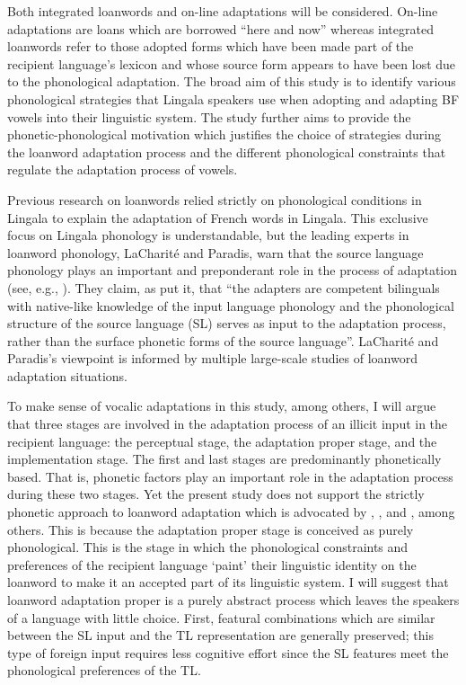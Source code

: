 \documentclass[output=paper]{langscibook}
\begin{document}
\begin{sloppypar}
Both integrated loanwords and on-line adaptations \citep{shinohara1997analyse} will be considered. On-line adaptations are loans which are borrowed “here and now” \citep[66]{calabrese2009loan} whereas integrated loanwords refer to those adopted forms which have been made part of the recipient language’s lexicon and whose source form appears to have been lost due to the phonological adaptation. The broad aim of this study is to identify various phonological strategies that Lingala speakers use when adopting and adapting BF vowels into their linguistic system. The study further aims to provide the phonetic-phonological motivation which justifies the choice of strategies during the loanword adaptation process and the different phonological constraints that regulate the adaptation process of vowels.
\end{sloppypar}

Previous research on loanwords \citep{mudimbe1977procedes,bambi1998preservation} relied strictly on phonological conditions in Lingala to explain the adaptation of French words in Lingala. This exclusive focus on Lingala phonology is understandable, but the leading experts in loanword phonology, LaCharité and Paradis, warn that the source language phonology plays an important and preponderant role in the process of adaptation (see, e.g., \citet{lacharite2005category}). They claim, as \citet[1]{kang2014french} put it, that “the adapters are competent bilinguals with native-like knowledge of the input language phonology and the phonological structure of the source language (SL) serves as input to the adaptation process, rather than the surface phonetic forms of the source language”. LaCharité and Paradis’s viewpoint is informed by multiple large-scale studies of loanword adaptation situations.

To make sense of vocalic adaptations in this study, among others, I will argue that three stages are involved in the adaptation process of an illicit input in the recipient language: the perceptual stage, the adaptation proper stage, and the implementation stage. The first and last stages are predominantly phonetically based. That is, phonetic factors play an important role in the adaptation process during these two stages. Yet the present study does not support the strictly phonetic approach to loanword adaptation which is advocated by \citet{peperkamp2003reinterpreting}, \citet{vendelin2004evidence}, and \citet{peperkamp2004psycholinguistic}, among others. This is because the adaptation proper stage is conceived as purely phonological. This is the stage in which the phonological constraints and preferences of the recipient language ‘paint’ their linguistic identity on the loanword to make it an accepted part of its linguistic system. I will suggest that loanword adaptation proper is a purely abstract process which leaves the speakers of a language with little choice. First, featural combinations which are similar between the SL input and the TL representation are generally preserved; this type of foreign input requires less cognitive effort since the SL features meet the phonological preferences of the TL.
\end{document}
